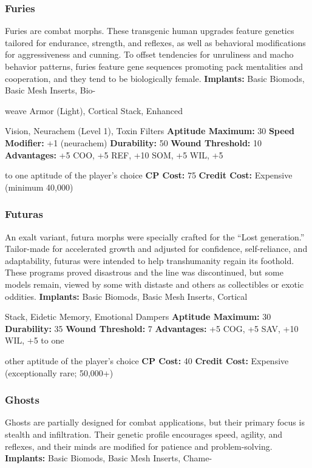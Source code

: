 \subsubsection{Furies}

Furies are combat morphs. These transgenic human 
upgrades feature genetics tailored for endurance, 
strength, and reflexes, as well as behavioral modifications
for aggressiveness and cunning. To offset tendencies
for unruliness and macho behavior patterns, furies
feature gene sequences promoting pack mentalities and 
cooperation, and they tend to be biologically female.
\textbf{Implants:  }Basic Biomods, Basic Mesh Inserts, Bio-

weave Armor (Light), Cortical Stack, Enhanced 

Vision, Neurachem (Level 1), Toxin Filters
\textbf{Aptitude Maximum: }30
\textbf{Speed Modifier: }+1 (neurachem)
\textbf{Durability:} 50
\textbf{Wound Threshold:} 10
\textbf{Advantages:} +5 COO, +5 REF, +10 SOM, +5 WIL, +5 

to one aptitude of the player's choice
\textbf{CP Cost:} 75
\textbf{Credit Cost: }Expensive (minimum 40,000)

\subsubsection{Futuras}

An exalt variant, futura morphs were specially crafted 
for the ``Lost generation.'' Tailor-made for accelerated
growth and adjusted for confidence, self-reliance,
and adaptability, futuras were intended to help transhumanity
regain its foothold. These programs proved
disastrous and the line was discontinued, but some 
models remain, viewed by some with distaste and 
others as collectibles or exotic oddities.
\textbf{Implants: }Basic Biomods, Basic Mesh Inserts, Cortical 

Stack, Eidetic Memory, Emotional Dampers
\textbf{Aptitude Maximum: }30
\textbf{Durability:} 35
\textbf{Wound Threshold: }7
\textbf{Advantages: }+5 COG, +5 SAV, +10 WIL, +5 to one 

other aptitude of the player's choice
\textbf{CP Cost: }40
\textbf{Credit Cost: }Expensive (exceptionally rare; 50,000+)

\subsubsection{Ghosts}

Ghosts are partially designed for combat applications, 
but their primary focus is stealth and infiltration. 
Their genetic profile encourages speed, agility, and 
reflexes, and their minds are modified for patience and 
problem-solving.
\textbf{Implants: }Basic Biomods, Basic Mesh Inserts, Chame-

